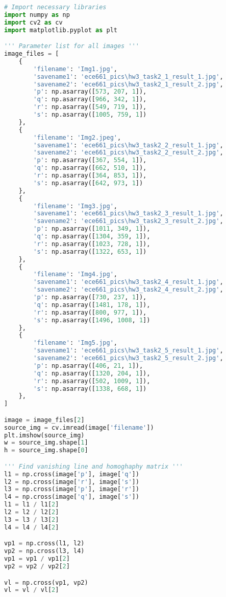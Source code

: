 \documentclass[11pt]{article}
\begin{document}
\begin{lstlisting}[language=Python, showstringspaces=false]
# Import necessary libraries
import numpy as np
import cv2 as cv
import matplotlib.pyplot as plt  

''' Parameter list for all images '''
image_files = [
    {
        'filename': 'Img1.jpg',
        'savename1': 'ece661_pics\hw3_task2_1_result_1.jpg',
        'savename2': 'ece661_pics\hw3_task2_1_result_2.jpg',
        'p': np.asarray([573, 207, 1]),
        'q': np.asarray([966, 342, 1]),
        'r': np.asarray([549, 719, 1]),
        's': np.asarray([1005, 759, 1])
    },
    {
        'filename': 'Img2.jpeg',
        'savename1': 'ece661_pics\hw3_task2_2_result_1.jpg',
        'savename2': 'ece661_pics\hw3_task2_2_result_2.jpg',
        'p': np.asarray([367, 554, 1]),
        'q': np.asarray([662, 510, 1]),
        'r': np.asarray([364, 853, 1]),
        's': np.asarray([642, 973, 1])
    },
    {
        'filename': 'Img3.jpg',
        'savename1': 'ece661_pics\hw3_task2_3_result_1.jpg',
        'savename2': 'ece661_pics\hw3_task2_3_result_2.jpg',
        'p': np.asarray([1011, 349, 1]),
        'q': np.asarray([1304, 359, 1]),
        'r': np.asarray([1023, 728, 1]),
        's': np.asarray([1322, 653, 1])
    },
    {
        'filename': 'Img4.jpg',
        'savename1': 'ece661_pics\hw3_task2_4_result_1.jpg',
        'savename2': 'ece661_pics\hw3_task2_4_result_2.jpg',
        'p': np.asarray([730, 237, 1]),
        'q': np.asarray([1481, 178, 1]),
        'r': np.asarray([800, 977, 1]),
        's': np.asarray([1496, 1008, 1])
    },
    {
        'filename': 'Img5.jpg',
        'savename1': 'ece661_pics\hw3_task2_5_result_1.jpg',
        'savename2': 'ece661_pics\hw3_task2_5_result_2.jpg',
        'p': np.asarray([406, 21, 1]),
        'q': np.asarray([1320, 204, 1]),
        'r': np.asarray([502, 1009, 1]),
        's': np.asarray([1338, 668, 1])
    },
]

image = image_files[2]
source_img = cv.imread(image['filename'])
plt.imshow(source_img)
w = source_img.shape[1]
h = source_img.shape[0]

''' Find vanishing line and homoghaphy matrix '''
l1 = np.cross(image['p'], image['q'])
l2 = np.cross(image['r'], image['s'])
l3 = np.cross(image['p'], image['r'])
l4 = np.cross(image['q'], image['s'])
l1 = l1 / l1[2]
l2 = l2 / l2[2]
l3 = l3 / l3[2]
l4 = l4 / l4[2]

vp1 = np.cross(l1, l2)
vp2 = np.cross(l3, l4)
vp1 = vp1 / vp1[2]
vp2 = vp2 / vp2[2]

vl = np.cross(vp1, vp2)
vl = vl / vl[2]


\end{lstlisting}
\end{document}
